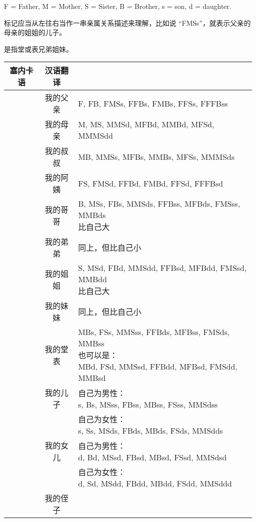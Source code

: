 F = Father, M = Mother, S = Sister, B = Brother, s = son, d = daughter.

标记应当从左往右当作一串亲属关系描述来理解，比如说 “FMSs”，就表示父亲的母亲的姐姐的儿子。

是指堂或表兄弟姐妹。

\begin{center}
\begin{tabular}{|c|c|p{10cm}|}
\hline
塞内卡语 & 汉语翻译 & \parbox[t]{10cm}{} \\ \hline
{} & 我的父亲 & F, FB, FMSs, FFBs, FMBs, FFSs, FFFBss \\ \hline
{} & 我的母亲 & M, MS, MMSd, MFBd, MMBd, MFSd, MMMSdd \\ \hline
{} & 我的叔叔 & MB, MMSs, MFBs, MMBs, MFSs, MMMSds \\ \hline
{} & 我的阿姨 & FS, FMSd, FFBd, FMBd, FFSd, FFFBsd \\ \hline
{} & 我的哥哥 & 
\parbox[t]{10cm}{B, MSs, FBs, MMSds, FFBss, MFBds, FMSss, MMBds\\比自己大} \\ \hline
{} & 我的弟弟 & 同上，但比自己小 \\ \hline
{} & 我的姐姐 & 
\parbox[t]{10cm}{S, MSd, FBd, MMSdd, FFBsd, MFBdd, FMSsd, MMBdd\\比自己大} \\ \hline
{} & 我的妹妹 & 同上，但比自己小 \\ \hline
{} & 我的堂表 & 
\parbox[t]{10cm}
{MBs, FSs, MMSss, FFBds, MFBss, FMSds, MMBss\\
也可以是：\\
MBd, FSd, MMSsd, FFBdd, MFBsd, FMSdd, MMBsd} \\ \hline
{} & 我的儿子 & 
\parbox[t]{10cm}{自己为男性：\\s, Bs, MSss, FBss, MBss, FSss, MMSdss} \\ & &
\parbox[t]{10cm}{自己为女性：\\s, Ss, MSds, FBds, MBds, FSds, MMSdds} \\ \hline
{} & 我的女儿 & 
\parbox[t]{10cm}{自己为男性：\\d, Bd, MSsd, FBsd, MBsd, FSsd, MMSdsd} \\ & &
\parbox[t]{10cm}{自己为女性：\\d, Sd, MSdd, FBdd, MBdd, FSdd, MMSddd} \\ \hline
{} & 我的侄子 & 

\end{tabular}
\end{center}
